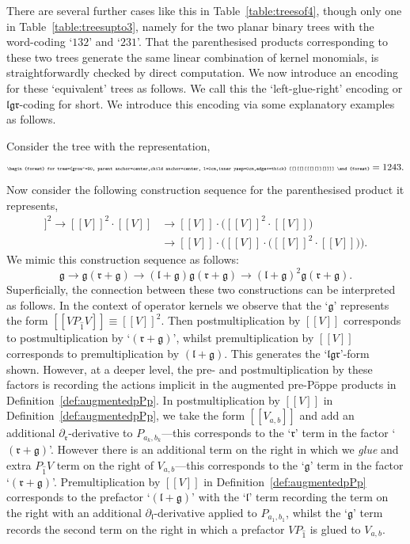 \documentclass[5p,twocolumn]{elsarticle}
\newcommand*{\pa}{{\partial}}
\newcommand*{\lb}{[\![}
\newcommand*{\rb}{]\!]}
\newcommand*{\el}{\mathfrak l}
\newcommand*{\gl}{\mathfrak g}
\newcommand*{\rl}{\mathfrak r}
\begin{document}
There are several further cases like this in Table~\ref{table:treesof4}, though only one in Table~\ref{table:treesupto3}, namely for the two planar binary trees
with the word-coding `$132$' and `$231$'. That the parenthesised products corresponding to these two trees generate the same linear combination of kernel monomials,
is straightforwardly checked by direct computation. We now introduce an encoding for these `equivalent' trees as follows.
We call this the `left-glue-right' encoding or $\el\gl\rl$-coding for short. We introduce this encoding via some explanatory examples as follows.
%
\begin{example}\label{ex:firstconstruct}
Consider the tree with the representation,
\begin{equation*}
{\tiny \begin{forest} for tree={grow'=90, parent anchor=center,child anchor=center, l=0cm,inner ysep=0cm,edge+=thick} [[][[][[[][]][]]]] \end{forest}}=1243.
\end{equation*}
Now consider the following construction sequence for the parenthesised product it represents,
\begin{align*}
  \lb V\rb^2 \to\lb V\rb^2\cdot\lb V\rb&\to \lb V\rb\cdot\bigl(\lb V\rb^2\cdot\lb V\rb\bigr)\\
  &\to\lb V\rb\cdot\bigl(\lb V\rb\cdot\bigl(\lb V\rb^2\cdot\lb V\rb\bigr)\bigr).
\end{align*}
We mimic this construction sequence as follows: 
\begin{equation*}
  \gl\to\gl(\rl+\gl)\to(\el+\gl)\gl(\rl+\gl)\to(\el+\gl)^2\gl(\rl+\gl).
\end{equation*}
Superficially, the connection between these two constructions can be interpreted as follows.
In the context of operator kernels we observe that the `$\gl$' represents the form $\lb VP_{\hat 1}V\rb\equiv\lb V\rb^2$.  
Then postmultiplication by $\lb V\rb$ corresponds to postmultiplication by `$(\rl+\gl)$', whilst premultiplication by $\lb V\rb$ corresponds to premultiplication by $(\el+\gl)$.
This generates the `$\el\gl\rl$'-form shown. However, at a deeper level, the pre- and postmultiplication by these factors is recording the actions implicit
in the augmented pre-P\"oppe products in Definition~\ref{def:augmentedpPp}. In postmultiplication by $\lb V\rb$ in Definition~\ref{def:augmentedpPp}, we take the form $\lb V_{a,b}\rb$
and add an additional $\pa_{\rl}$-derivative to $P_{a_k,b_k}$---this corresponds to the `$\rl$' term in the factor `$(\rl+\gl)$'. However there is an additional term on the right
in which we \emph{glue} and extra $P_{\hat 1}V$ term on the right of $V_{a,b}$---this corresponds to the `$\gl$' term in the factor `$(\rl+\gl)$'.
Premultiplication by $\lb V\rb$ in Definition~\ref{def:augmentedpPp} corresponds to the prefactor `$(\el+\gl)$' with the `$\el$' term recording
the term on the right with an additional $\pa_{\el}$-derivative applied to $P_{a_1,b_1}$,
whilst the `$\gl$' term records the second term on the right in which a prefactor $VP_{\hat 1}$ is glued to $V_{a,b}$.
\end{example}
\end{document}
